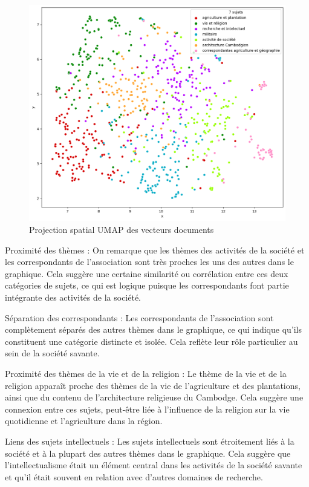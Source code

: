 \begin{figure}[H] %
    \centering
    \includegraphics[width=14cm]{img/umap7.png}
    \caption{Projection spatial UMAP des vecteurs documents}
    \label{umap7}
\end{figure}

Proximité des thèmes : On remarque que les thèmes des activités de la société et les correspondants de l'association sont très proches les uns des autres dans le graphique. Cela suggère une certaine similarité ou corrélation entre ces deux catégories de sujets, ce qui est logique puisque les correspondants font partie intégrante des activités de la société.

Séparation des correspondants : Les correspondants de l'association sont complètement séparés des autres thèmes dans le graphique, ce qui indique qu'ils constituent une catégorie distincte et isolée. Cela reflète leur rôle particulier au sein de la société savante.

Proximité des thèmes de la vie et de la religion : Le thème de la vie et de la religion apparaît proche des thèmes de la vie de l'agriculture et des plantations, ainsi que du contenu de l'architecture religieuse du Cambodge. Cela suggère une connexion entre ces sujets, peut-être liée à l'influence de la religion sur la vie quotidienne et l'agriculture dans la région.

Liens des sujets intellectuels : Les sujets intellectuels sont étroitement liés à la société et à la plupart des autres thèmes dans le graphique. Cela suggère que l'intellectualisme était un élément central dans les activités de la société savante et qu'il était souvent en relation avec d'autres domaines de recherche.

